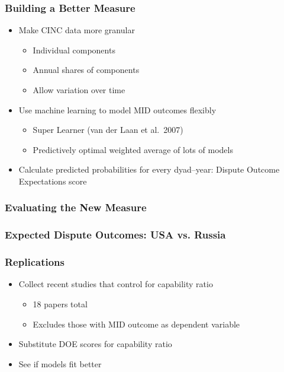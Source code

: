 \documentclass{beamer}
\begin{document}
\begin{frame}
  \frametitle{Building a Better Measure}

  \begin{itemize}
    \item Make CINC data more granular
    \begin{itemize}
      \item Individual components
      \item Annual shares of components
      \item Allow variation over time
    \end{itemize}
    \item Use machine learning to model MID outcomes flexibly
    \begin{itemize}
      \item Super Learner (van der Laan et al.\ 2007)
      \item Predictively optimal weighted average of lots of models
    \end{itemize}
    \item Calculate predicted probabilities for every dyad--year: Dispute Outcome Expectations score
  \end{itemize}
\end{frame}

\begin{frame}
  \frametitle{Evaluating the New Measure}

  
\end{frame}

\begin{frame}
  \frametitle{Expected Dispute Outcomes: USA vs. Russia}

\end{frame}

\begin{frame}
  \frametitle{Replications}

  \begin{itemize}
    \item Collect recent studies that control for capability ratio
    \begin{itemize}
      \item 18 papers total
      \item Excludes those with MID outcome as dependent variable
    \end{itemize}
    \item Substitute DOE scores for capability ratio
    \item See if models fit better
  \end{itemize}
\end{frame}
\end{document}
